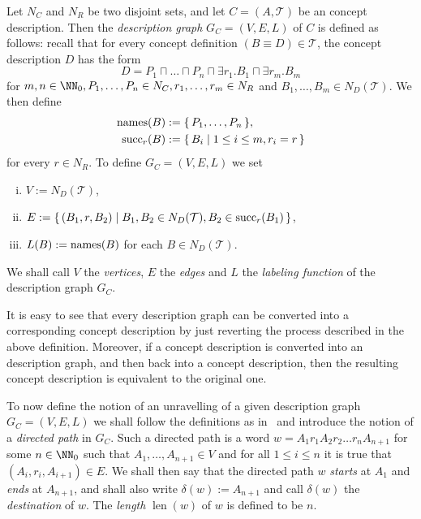 \begin{Definition}
  \label{def:EL-description-graph}
  Let $N_C$ and $N_R$ be two disjoint sets, and let $C = (A, \mathcal{T})$ be an \ELgfp
  concept description.  Then the \emph{\EL description graph} $G_C = (V, E, L)$ of $C$ is
  defined as follows: recall that for every concept definition $(B \equiv D) \in
  \mathcal{T}$, the concept description $D$ has the form
  \begin{equation*}
    D = P_1 \sqcap \dots \sqcap P_n \sqcap \exists r_1. B_1 \sqcap \exists r_m. B_m
  \end{equation*}
  for $m, n \in \NN_0, P_1, \dots, P_n \in N_C, r_1, \dots, r_m \in N_R$ and $B_1, \dots,
  B_m \in N_D(\mathcal{T})$.  We then define
  \begin{align*}
    \operatorname{names}(B) &:= {\{\, P_1, \dots, P_n \,\}},\\
    \operatorname{succ}_r(B) &:= {\{\, B_i \mid 1 \leq i \leq m, r_i = r \,\}}
  \end{align*}
  for every $r \in N_R$.  To define $G_C = (V, E, L)$ we set
  \begin{enumerate}[i. ]
  \item $V := N_D(\mathcal{T})$,
  \item $E := {\{\, (B_1, r, B_2) \mid B_1, B_2 \in N_D(\mathcal{T}), B_2 \in
      \operatorname{succ}_r(B_1) \,\}}$,
  \item $L(B) := \operatorname{names}(B)$ for each $B \in N_D(\mathcal{T})$.
  \end{enumerate}
  We shall call $V$ the \emph{vertices}, $E$ the \emph{edges} and $L$ the \emph{labeling
    function} of the description graph $G_C$.
\end{Definition}

It is easy to see that every \EL description graph can be converted into a corresponding
concept description by just reverting the process described in the above definition.
Moreover, if a concept description is converted into an \EL description graph, and then
back into a concept description, then the resulting concept description is equivalent to
the original one.

To now define the notion of an unravelling of a given \EL description graph $G_C = (V, E,
L)$ we shall follow the definitions as in~\cite{Diss-Felix} and introduce the notion of a
\emph{directed path} in $G_C$.  Such a directed path is a word $w = A_1 r_1 A_2 r_2 \dots
r_n A_{n+1}$ for some $n \in \NN_0$ such that $A_1, \dots, A_{n+1} \in V$ and for all $1
\leq i \leq n$ it is true that $(A_i, r_i, A_{i+1}) \in E$.  We shall then say that the
directed path $w$ \emph{starts} at $A_1$ and \emph{ends} at $A_{n+1}$, and shall also
write $\delta(w) := A_{n+1}$ and call $\delta(w)$ the \emph{destination} of $w$.  The
\emph{length} $\operatorname{len}(w)$ of $w$ is defined to be $n$.

